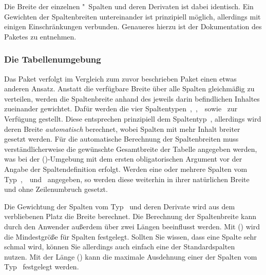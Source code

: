\documentclass[%
  english,ngerman,%
  cdgeometry=no,DIV=12,automark,%
]{tudscrartcl}
\begin{document}
\InputCode\noindent
%
Die Breite der einzelnen "~Spalten und deren Derivaten ist dabei 
identisch. Ein Gewichten der Spaltenbreiten untereinander ist prinzipiell 
möglich, allerdings mit einigen Einschränkungen verbunden. Genaueres hierzu ist 
der Dokumentation des Paketes  zu entnehmen.

\subsubsection{Die Tabellenumgebung }
\label{sec:tabulary}%
%
Das Paket  verfolgt im Vergleich zum zuvor beschrieben Paket 
 einen etwas anderen Ansatz. Anstatt die verfügbare Breite 
über alle Spalten gleichmäßig zu verteilen, werden die Spaltenbreite anhand des 
jeweils darin befindlichen Inhaltes zueinander gewichtet. Dafür werden die vier 
Spaltentypen~,~,~~sowie~ zur Verfügung 
gestellt. Diese entsprechen prinzipiell dem Spaltentyp~, allerdings 
wird deren Breite \emph{automatisch} berechnet, wobei Spalten mit mehr Inhalt 
breiter gesetzt werden. Für die automatische Berechnung der Spaltenbreiten muss 
verständlicherweise die gewünschte Gesamtbreite der Tabelle angegeben werden, 
was bei der ()-Umgebung mit dem ersten 
obligatorischen Argument vor der Angabe der Spaltendefinition erfolgt. Werden 
eine oder mehrere Spalten vom Typ~,~~und~ 
angegeben, so werden diese weiterhin in ihrer natürlichen Breite und ohne 
Zeilenumbruch gesetzt. 

Die Gewichtung der Spalten vom Typ~ und deren Derivate wird aus 
dem verbliebenen Platz die Breite berechnet. Die Berechnung der Spaltenbreite 
kann durch den Anwender außerdem über zwei Längen beeinflusst werden. Mit 
() wird die Mindestgröße für Spalten 
festgelegt. Sollten Sie wissen, dass eine Spalte sehr schmal wird, können Sie 
allerdings auch einfach eine der Standardspalten~ nutzen. Mit der 
Länge () kann die maximale Ausdehnung einer der 
Spalten vom Typ~ festgelegt werden. 
\end{document}
